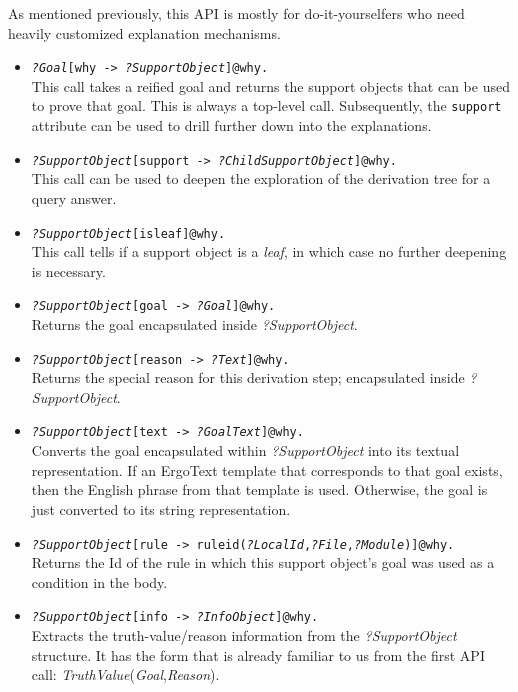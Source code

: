 As mentioned previously, this API is mostly for do-it-yourselfers who need
heavily customized explanation mechanisms.
\begin{itemize}
\item  \texttt{\textnormal{\emph{?Goal}}[why ->
    \texttt{\textnormal{\emph{?SupportObject}}}]@\bs{}why.}
  \\
  This call takes a reified goal and returns the support objects that can
  be used to prove that goal. This is always a top-level
  call. Subsequently, the \texttt{support} attribute can be used to drill
  further down into the explanations. 
\item \texttt{\textnormal{\emph{?SupportObject}}[support ->
    \texttt{\textnormal{\emph{?ChildSupportObject}}}]@\bs{}why.}
  \\
  This call can be used to deepen the exploration of the derivation tree
  for a query answer.
\item \texttt{\textnormal{\emph{?SupportObject}}[isleaf]@\bs{}why.}
  \\
  This call tells if a support object is a \emph{leaf}, in which case no
  further deepening is necessary. 
\item \texttt{\textnormal{\emph{?SupportObject}}[goal ->
    \texttt{\textnormal{\emph{?Goal}}}]@\bs{}why.}
  \\
  Returns the goal encapsulated inside \emph{?SupportObject}. 
\item \texttt{\textnormal{\emph{?SupportObject}}[reason ->
    \texttt{\textnormal{\emph{?Text}}}]@\bs{}why.}
  \\
  Returns the special reason for this derivation step;
  encapsulated inside \emph{?SupportObject}. 
\item \texttt{\textnormal{\emph{?SupportObject}}[text ->
    \texttt{\textnormal{\emph{?GoalText}}}]@\bs{}why.}
  \\
  Converts the goal encapsulated within \emph{?SupportObject} into its
  textual representation. If an ErgoText template that corresponds to  that
  goal exists, then the English phrase from that template is
  used. Otherwise, the goal is just converted to its string representation. 
\item \texttt{\textnormal{\emph{?SupportObject}}[rule ->
    \texttt{ruleid(\textnormal{\emph{?LocalId}},\textnormal{\emph{?File}},\textnormal{\emph{?Module}})}]@\bs{}why.}
  \\
  Returns the Id of the rule in which this support object's goal was
  used as a condition in the body.
\item \texttt{\textnormal{\emph{?SupportObject}}[info ->
    \texttt{\textnormal{\emph{?InfoObject}}}]@\bs{}why.}
  \\
  Extracts the truth-value/reason information from the
  \emph{?SupportObject} structure. It has the form that is already familiar
  to us from the first API call:
  \emph{TruthValue}(\emph{Goal},\emph{Reason}).
\end{itemize}

